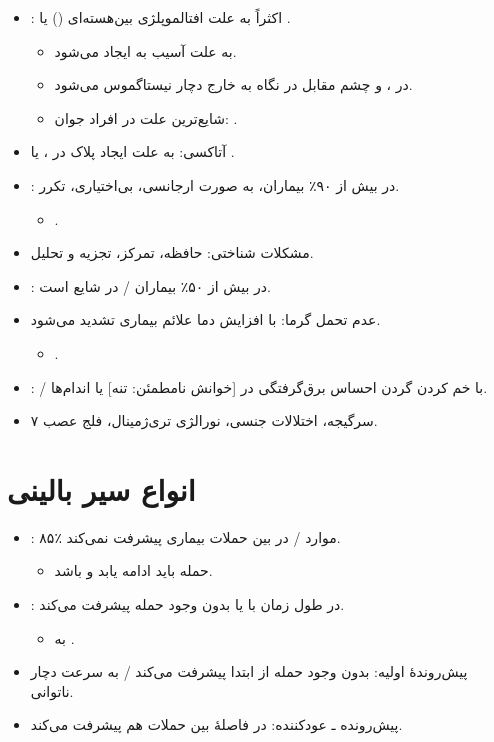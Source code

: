 \documentclass[a4paper,12pt]{extbook}
\begin{document}
\begin{itemize}
\item {}: اکثراً به علت افتالموپلژی بین‌هسته‌ای () یا .
\begin{itemize}
\item {} به علت آسیب به  ایجاد می‌شود.
\item در ،  و چشم مقابل در نگاه به خارج دچار نیستاگموس می‌شود.
\item شایع‌ترین علت  در افراد جوان: .
\end{itemize}
\item آتاکسی: به علت ایجاد پلاک در ،  یا .
\item {}: در بیش از ۹۰٪ بیماران، به صورت ارجانسی، بی‌اختیاری، تکرر.
\begin{itemize}
\item {}.
\end{itemize}
\item مشکلات شناختی: حافظه، تمرکز، تجزیه و تحلیل.
\item {}: در بیش از ۵۰٪ بیماران /  در  شایع است.
\item عدم تحمل گرما: با افزایش دما علائم بیماری تشدید می‌شود.
\begin{itemize}
\item {}.
\end{itemize}
\item {}:  / با خم کردن گردن احساس برق‌گرفتگی در [خوانش نامطمئن: تنه] یا اندام‌ها.
\item سرگیجه، اختلالات جنسی، نورالژی تری‌ژمینال، فلج عصب ۷.
\end{itemize}
\section*{انواع سیر بالینی }
\begin{itemize}
\item {}: ۸۵٪ موارد / در بین حملات بیماری پیشرفت نمی‌کند.
\begin{itemize}
\item حمله باید  ادامه یابد و  باشد.
\end{itemize}
\item {}: در طول زمان با یا بدون وجود حمله پیشرفت می‌کند.
\begin{itemize}
\item {} به .
\end{itemize}
\item پیش‌روندهٔ اولیه: بدون وجود حمله از ابتدا پیشرفت می‌کند / به سرعت دچار ناتوانی.
\item پیش‌رونده ـ عودکننده: در فاصلهٔ بین حملات هم پیشرفت می‌کند.
\end{itemize}
\end{document}
